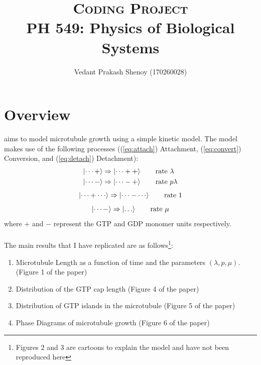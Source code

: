\documentclass[11pt]{article}
\title{\textsc{\Large Coding Project\\}PH 549: Physics of Biological Systems\\}
\author{Vedant Prakash Shenoy (170260028)}
\newcommand{\itemspacing}{
	\setlength{\parskip}{0pt}\setlength{\itemsep}{0pt}
}
\begin{document}
\maketitle
\section{Overview}
\citet[henceforth referred to as 'the paper']{PhysRevE.76.041907} aims to model microtubule growth using a simple kinetic model. The model makes use of the following processes ((\ref{eq:attach}) Attachment, (\ref{eq:convert}) Conversion, and (\ref{eq:detach}) Detachment):
\begin{equation}
\label{eq:attach}
\begin{split}
\ket{\dots+} &\Rightarrow \ket{\dots++}\hspace{2em} \text{rate }\lambda\\
\ket{\dots-} &\Rightarrow \ket{\dots-+}\hspace{2em} \text{rate }p\lambda\\
\end{split}
\end{equation}
\begin{equation}
\label{eq:convert}
\ket{\dots+\cdots} \Rightarrow \ket{\dots-\cdots}\hspace{2em} \text{rate }1
\end{equation}
\begin{equation}
\label{eq:detach}
\ket{\dots-} \Rightarrow \ket{\dots}\hspace{2em} \text{rate }\mu
\end{equation}
where $+$ and $-$ represent the GTP and GDP monomer units respectively. \\\\
The main results that I have replicated are as follows\footnote{Figures 2 and 3 are cartoons to explain the model and have not been reproduced here}:
\begin{enumerate}
\item Microtubule Length as a function of time and the parameters $(\lambda, p, \mu)$. (Figure 1 of the paper)
\item Distribution of the GTP cap length (Figure 4 of the paper)
\item Distribution of GTP islands in the microtubule (Figure 5 of the paper)
\item Phase Diagrams of microtubule growth (Figure 6 of the paper)
\end{enumerate}
\end{document}
